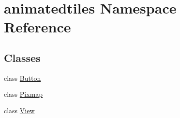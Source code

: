 \hypertarget{namespaceanimatedtiles}{}\section{animatedtiles Namespace Reference}
\label{namespaceanimatedtiles}
\subsection*{Classes}
\begin{DoxyCompactItemize}
\item 
class \hyperlink{classanimatedtiles_1_1Button}{Button}
\item 
class \hyperlink{classanimatedtiles_1_1Pixmap}{Pixmap}
\item 
class \hyperlink{classanimatedtiles_1_1View}{View}
\end{DoxyCompactItemize}
